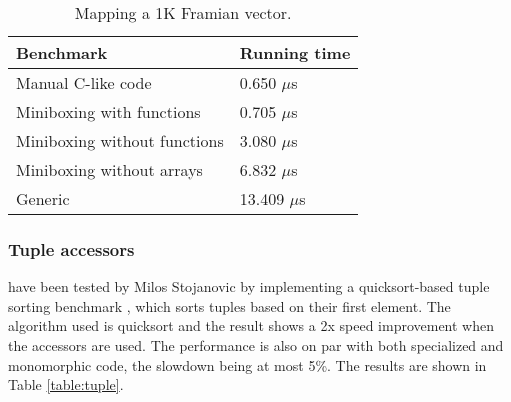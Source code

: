 \begin{table}[b]
  \begin{tabularx}{0.48\textwidth}{|g *{1}{|Y}|} \hline
    \textbf{Benchmark}             &  \textbf{Running time} \\ \hline
    Manual C-like code             &         0.650 $\mu$s \\
    Miniboxing with functions      &         0.705 $\mu$s \\
    Miniboxing without functions   &         3.080 $\mu$s \\
    Miniboxing without arrays      &         6.832 $\mu$s \\
    Generic                        &        13.409 $\mu$s \\ \hline
  \end{tabularx}
  \vspace{-2mm}
  \caption{Mapping a 1K Framian vector.}
  \label{table:framian}
  \vspace{-1em}
\end{table}

\subsubsection{Tuple accessors} have been tested by Milos Stojanovic by implementing a quicksort-based tuple sorting benchmark \cite{tuple-bench}, which sorts tuples based on their first element. The algorithm used is quicksort and the result shows a 2x speed improvement when the accessors are used. The performance is also on par with both specialized and monomorphic code, the slowdown being at most 5\%. The results are shown in Table \ref{table:tuple}.

